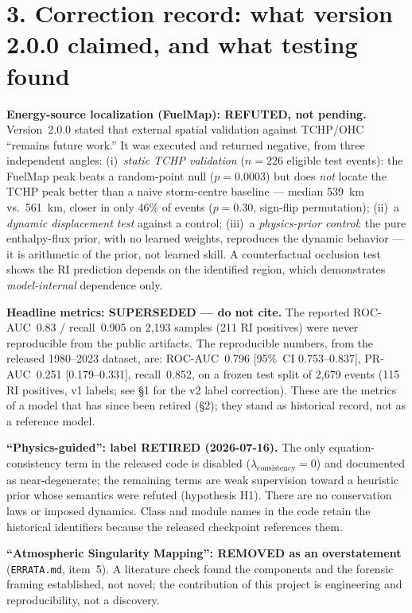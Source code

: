 \documentclass[11pt]{article}
\begin{document}
\section*{3. Correction record: what version 2.0.0 claimed, and what testing found}

\textbf{Energy-source localization (FuelMap): REFUTED, not pending.}
Version~2.0.0 stated that external spatial validation against TCHP/OHC
``remains future work.'' It was executed and returned negative, from
three independent angles: (i)~\emph{static TCHP validation} ($n=226$
eligible test events): the FuelMap peak beats a random-point null
($p=0.0003$) but does \emph{not} locate the TCHP peak better than a naive
storm-centre baseline --- median 539~km vs.\ 561~km, closer in only 46\%
of events ($p=0.30$, sign-flip permutation); (ii)~a \emph{dynamic
displacement test} against a control; (iii)~a \emph{physics-prior
control}: the pure enthalpy-flux prior, with no learned weights,
reproduces the dynamic behavior --- it is arithmetic of the prior, not
learned skill. A counterfactual occlusion test shows the RI prediction
depends on the identified region, which demonstrates
\emph{model-internal} dependence only.

\textbf{Headline metrics: SUPERSEDED --- do not cite.} The reported
ROC-AUC~0.83 / recall~0.905 on 2{,}193 samples (211 RI positives) were
never reproducible from the public artifacts. The reproducible numbers,
from the released 1980--2023 dataset, are: ROC-AUC~0.796
[95\%~CI 0.753--0.837], PR-AUC~0.251 [0.179--0.331], recall~0.852, on a
frozen test split of 2{,}679 events (115 RI positives, v1 labels; see
\S1 for the v2 label correction). These are the metrics of a model that
has since been retired (\S2); they stand as historical record, not as a
reference model.

\textbf{``Physics-guided'': label RETIRED (2026-07-16).} The only
equation-consistency term in the released code is disabled
($\lambda_{\mathrm{consistency}}=0$) and documented as near-degenerate;
the remaining terms are weak supervision toward a heuristic prior whose
semantics were refuted (hypothesis H1). There are no conservation laws or
imposed dynamics. Class and module names in the code retain the
historical identifiers because the released checkpoint references them.

\textbf{``Atmospheric Singularity Mapping'': REMOVED as an overstatement}
(\texttt{ERRATA.md}, item~5). A literature check found the components and
the forensic framing established, not novel; the contribution of this
project is engineering and reproducibility, not a discovery.
\end{document}
